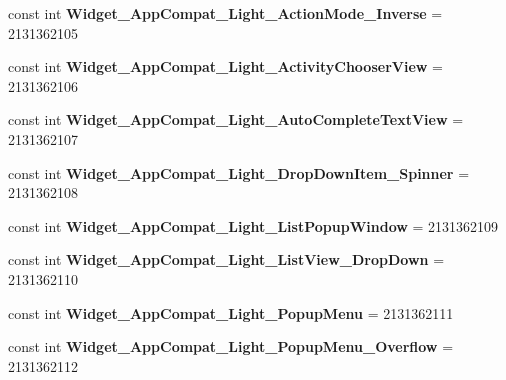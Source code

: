 \begin{DoxyCompactItemize}
\item 
\mbox{\label{classXaria_1_1Resource_1_1Style_a0530cc3e78a9e2ff8ceb84f0d775a642}} 
const int {\bfseries Widget\+\_\+\+App\+Compat\+\_\+\+Light\+\_\+\+Action\+Mode\+\_\+\+Inverse} = 2131362105
\item 
\mbox{\label{classXaria_1_1Resource_1_1Style_a39f0169dfbf8eb8a060b61336fdde119}} 
const int {\bfseries Widget\+\_\+\+App\+Compat\+\_\+\+Light\+\_\+\+Activity\+Chooser\+View} = 2131362106
\item 
\mbox{\label{classXaria_1_1Resource_1_1Style_a23d79910ef86c8d19ed796722233a23f}} 
const int {\bfseries Widget\+\_\+\+App\+Compat\+\_\+\+Light\+\_\+\+Auto\+Complete\+Text\+View} = 2131362107
\item 
\mbox{\label{classXaria_1_1Resource_1_1Style_a575b8f5769384b86f176f8a6d91d8eac}} 
const int {\bfseries Widget\+\_\+\+App\+Compat\+\_\+\+Light\+\_\+\+Drop\+Down\+Item\+\_\+\+Spinner} = 2131362108
\item 
\mbox{\label{classXaria_1_1Resource_1_1Style_af0da322535918d06fcd3bacb43863a8b}} 
const int {\bfseries Widget\+\_\+\+App\+Compat\+\_\+\+Light\+\_\+\+List\+Popup\+Window} = 2131362109
\item 
\mbox{\label{classXaria_1_1Resource_1_1Style_a34698bf48ddf5228d3c2319b9779d022}} 
const int {\bfseries Widget\+\_\+\+App\+Compat\+\_\+\+Light\+\_\+\+List\+View\+\_\+\+Drop\+Down} = 2131362110
\item 
\mbox{\label{classXaria_1_1Resource_1_1Style_aada49a0237af92fbb19691d5e8bf1e4c}} 
const int {\bfseries Widget\+\_\+\+App\+Compat\+\_\+\+Light\+\_\+\+Popup\+Menu} = 2131362111
\item 
\mbox{\label{classXaria_1_1Resource_1_1Style_a09cb82ed332e7f2ff7295d7a21040925}} 
const int {\bfseries Widget\+\_\+\+App\+Compat\+\_\+\+Light\+\_\+\+Popup\+Menu\+\_\+\+Overflow} = 2131362112
\item 
\mbox{\label{classXaria_1_1Resource_1_1Style_a0cb4f54ccd8c3249a41b782f029b1002}} 

\end{DoxyCompactItemize}
